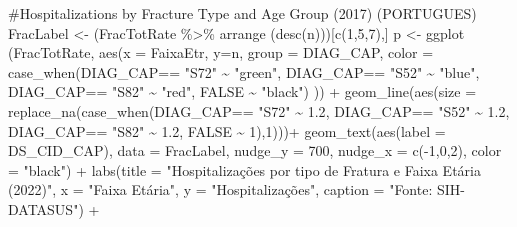 \documentclass[
  letterpaper,
  DIV=11,
  numbers=noendperiod]{scrartcl}
\newenvironment{Shaded}{\begin{snugshade}}{\end{snugshade}}
\newcommand{\AttributeTok}[1]{\textcolor[rgb]{0.40,0.45,0.13}{#1}}
\newcommand{\CommentTok}[1]{\textcolor[rgb]{0.37,0.37,0.37}{#1}}
\newcommand{\ConstantTok}[1]{\textcolor[rgb]{0.56,0.35,0.01}{#1}}
\newcommand{\DecValTok}[1]{\textcolor[rgb]{0.68,0.00,0.00}{#1}}
\newcommand{\FloatTok}[1]{\textcolor[rgb]{0.68,0.00,0.00}{#1}}
\newcommand{\FunctionTok}[1]{\textcolor[rgb]{0.28,0.35,0.67}{#1}}
\newcommand{\NormalTok}[1]{\textcolor[rgb]{0.00,0.23,0.31}{#1}}
\newcommand{\OtherTok}[1]{\textcolor[rgb]{0.00,0.23,0.31}{#1}}
\newcommand{\SpecialCharTok}[1]{\textcolor[rgb]{0.37,0.37,0.37}{#1}}
\newcommand{\StringTok}[1]{\textcolor[rgb]{0.13,0.47,0.30}{#1}}
\begin{document}
\begin{Shaded}
\begin{Highlighting}[]
\CommentTok{\#Hospitalizations by Fracture Type and Age Group (2017) (PORTUGUES)}
\NormalTok{FracLabel }\OtherTok{\textless{}{-}}\NormalTok{ (FracTotRate }\SpecialCharTok{\%\textgreater{}\%} \FunctionTok{arrange}\NormalTok{ (}\FunctionTok{desc}\NormalTok{(n)))[}\FunctionTok{c}\NormalTok{(}\DecValTok{1}\NormalTok{,}\DecValTok{5}\NormalTok{,}\DecValTok{7}\NormalTok{),]}
\NormalTok{p }\OtherTok{\textless{}{-}} \FunctionTok{ggplot}\NormalTok{ (FracTotRate, }\FunctionTok{aes}\NormalTok{(}\AttributeTok{x =}\NormalTok{ FaixaEtr, }\AttributeTok{y=}\NormalTok{n, }\AttributeTok{group =}\NormalTok{ DIAG\_CAP,}
                         \AttributeTok{color =} \FunctionTok{case\_when}\NormalTok{(DIAG\_CAP}\SpecialCharTok{==} \StringTok{"S72"} \SpecialCharTok{\textasciitilde{}} \StringTok{"green"}\NormalTok{,}
\NormalTok{                                           DIAG\_CAP}\SpecialCharTok{==} \StringTok{"S52"} \SpecialCharTok{\textasciitilde{}} \StringTok{"blue"}\NormalTok{,}
\NormalTok{                                           DIAG\_CAP}\SpecialCharTok{==} \StringTok{"S82"} \SpecialCharTok{\textasciitilde{}} \StringTok{"red"}\NormalTok{,}
                                           \ConstantTok{FALSE} \SpecialCharTok{\textasciitilde{}} \StringTok{"black"}\NormalTok{)}
\NormalTok{                         )) }\SpecialCharTok{+}
    \FunctionTok{geom\_line}\NormalTok{(}\FunctionTok{aes}\NormalTok{(}\AttributeTok{size =} \FunctionTok{replace\_na}\NormalTok{(}\FunctionTok{case\_when}\NormalTok{(DIAG\_CAP}\SpecialCharTok{==} \StringTok{"S72"} \SpecialCharTok{\textasciitilde{}} \FloatTok{1.2}\NormalTok{,}
\NormalTok{                                              DIAG\_CAP}\SpecialCharTok{==} \StringTok{"S52"} \SpecialCharTok{\textasciitilde{}} \FloatTok{1.2}\NormalTok{,}
\NormalTok{                                              DIAG\_CAP}\SpecialCharTok{==} \StringTok{"S82"} \SpecialCharTok{\textasciitilde{}} \FloatTok{1.2}\NormalTok{,}
                                              \ConstantTok{FALSE} \SpecialCharTok{\textasciitilde{}} \DecValTok{1}\NormalTok{),}\DecValTok{1}\NormalTok{)))}\SpecialCharTok{+}
    \FunctionTok{geom\_text}\NormalTok{(}\FunctionTok{aes}\NormalTok{(}\AttributeTok{label =}\NormalTok{ DS\_CID\_CAP), }\AttributeTok{data =}\NormalTok{ FracLabel, }\AttributeTok{nudge\_y =} \DecValTok{700}\NormalTok{, }\AttributeTok{nudge\_x =} \FunctionTok{c}\NormalTok{(}\SpecialCharTok{{-}}\DecValTok{1}\NormalTok{,}\DecValTok{0}\NormalTok{,}\DecValTok{2}\NormalTok{), }\AttributeTok{color =} \StringTok{"black"}\NormalTok{) }\SpecialCharTok{+}
    \FunctionTok{labs}\NormalTok{(}\AttributeTok{title =} \StringTok{"Hospitalizações por tipo de Fratura e Faixa Etária (2022)"}\NormalTok{, }\AttributeTok{x =} \StringTok{"Faixa Etária"}\NormalTok{, }\AttributeTok{y =} \StringTok{"Hospitalizações"}\NormalTok{, }\AttributeTok{caption =} \StringTok{"Fonte: SIH{-}DATASUS"}\NormalTok{) }\SpecialCharTok{+}

\end{Highlighting}
\end{Shaded}
\end{document}
